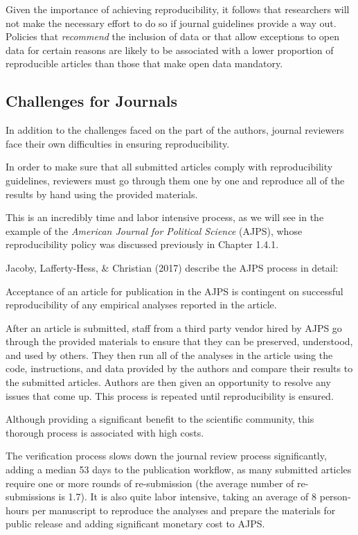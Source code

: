 \documentclass[12pt,twoside]{reedthesis}
\begin{document}
Given the importance of achieving reproducibility, it follows that researchers will not make the necessary effort to do so if journal guidelines provide a way out. Policies that \emph{recommend} the inclusion of data or that allow exceptions to open data for certain reasons are likely to be associated with a lower proportion of reproducible articles than those that make open data mandatory.

\hypertarget{challenges-for-journals}{%
\subsection{Challenges for Journals}\label{challenges-for-journals}}

In addition to the challenges faced on the part of the authors, journal reviewers face their own difficulties in ensuring reproducibility.

In order to make sure that all submitted articles comply with reproducibility guidelines, reviewers must go through them one by one and reproduce all of the results by hand using the provided materials.

This is an incredibly time and labor intensive process, as we will see in the example of the \emph{American Journal for Political Science} (AJPS), whose reproducibility policy was discussed previously in Chapter 1.4.1.

Jacoby, Lafferty-Hess, \& Christian (2017) describe the AJPS process in detail:

Acceptance of an article for publication in the AJPS is contingent on successful reproducibility of any empirical analyses reported in the article.

After an article is submitted, staff from a third party vendor hired by AJPS go through the provided materials to ensure that they can be preserved, understood, and used by others. They then run all of the analyses in the article using the code, instructions, and data provided by the authors and compare their results to the submitted articles. Authors are then given an opportunity to resolve any issues that come up. This process is repeated until reproducibility is ensured.

Although providing a significant benefit to the scientific community, this thorough process is associated with high costs.

The verification process slows down the journal review process significantly, adding a median 53 days to the publication workflow, as many submitted articles require one or more rounds of re-submission (the average number of re-submissions is 1.7). It is also quite labor intensive, taking an average of 8 person-hours per manuscript to reproduce the analyses and prepare the materials for public release and adding significant monetary cost to AJPS.
\end{document}
